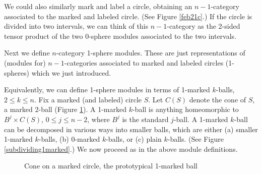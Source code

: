 We could also similarly mark and label a circle, obtaining an $n{-}1$-category
associated to the marked and labeled circle.
(See Figure \ref{feb21c}.)
If the circle is divided into two intervals, we can think of this $n{-}1$-category
as the 2-sided tensor product of the two 0-sphere modules associated to the two intervals.

\medskip

Next we define $n$-category 1-sphere modules.
These are just representations of (modules for) $n{-}1$-categories associated to marked and labeled 
circles (1-spheres) which we just introduced.

Equivalently, we can define 1-sphere modules in terms of 1-marked $k$-balls, $2\le k\le n$.
Fix a marked (and labeled) circle $S$.
Let $C(S)$ denote the cone of $S$, a marked 2-ball (Figure \ref{feb21d}).
A 1-marked $k$-ball is anything homeomorphic to $B^j \times C(S)$, $0\le j\le n-2$, 
where $B^j$ is the standard $j$-ball.
A 1-marked $k$-ball can be decomposed in various ways into smaller balls, which are either 
(a) smaller 1-marked $k$-balls, (b) 0-marked $k$-balls, or (c) plain $k$-balls.
(See Figure \ref{subdividing1marked}.)
We now proceed as in the above module definitions.

\begin{figure}[t] \centering
{}
\caption{Cone on a marked circle, the prototypical 1-marked ball}
\label{feb21d}
\end{figure}

